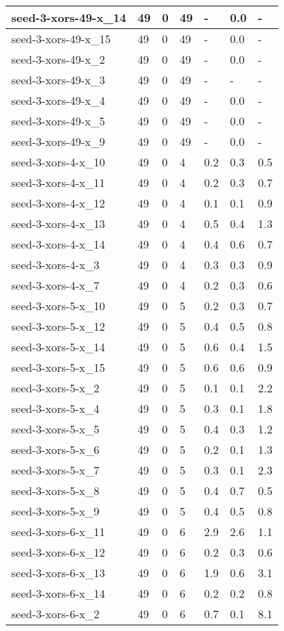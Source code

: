 \begin{scriptsize}
\begin{longtable}{|p{5cm}|l|l|l|l|l|l|}
seed-3-xors-49-x\_14&49&0&49&-&0.0&- \\ \hline 
seed-3-xors-49-x\_15&49&0&49&-&0.0&- \\ \hline 
seed-3-xors-49-x\_2&49&0&49&-&0.0&- \\ \hline 
seed-3-xors-49-x\_3&49&0&49&-&-&- \\ \hline 
seed-3-xors-49-x\_4&49&0&49&-&0.0&- \\ \hline 
seed-3-xors-49-x\_5&49&0&49&-&0.0&- \\ \hline 
seed-3-xors-49-x\_9&49&0&49&-&0.0&- \\ \hline 
seed-3-xors-4-x\_10&49&0&4&0.2&0.3&0.5 \\ \hline 
seed-3-xors-4-x\_11&49&0&4&0.2&0.3&0.7 \\ \hline 
seed-3-xors-4-x\_12&49&0&4&0.1&0.1&0.9 \\ \hline 
seed-3-xors-4-x\_13&49&0&4&0.5&0.4&1.3 \\ \hline 
seed-3-xors-4-x\_14&49&0&4&0.4&0.6&0.7 \\ \hline 
seed-3-xors-4-x\_3&49&0&4&0.3&0.3&0.9 \\ \hline 
seed-3-xors-4-x\_7&49&0&4&0.2&0.3&0.6 \\ \hline 
seed-3-xors-5-x\_10&49&0&5&0.2&0.3&0.7 \\ \hline 
seed-3-xors-5-x\_12&49&0&5&0.4&0.5&0.8 \\ \hline 
seed-3-xors-5-x\_14&49&0&5&0.6&0.4&1.5 \\ \hline 
seed-3-xors-5-x\_15&49&0&5&0.6&0.6&0.9 \\ \hline 
seed-3-xors-5-x\_2&49&0&5&0.1&0.1&2.2 \\ \hline 
seed-3-xors-5-x\_4&49&0&5&0.3&0.1&1.8 \\ \hline 
seed-3-xors-5-x\_5&49&0&5&0.4&0.3&1.2 \\ \hline 
seed-3-xors-5-x\_6&49&0&5&0.2&0.1&1.3 \\ \hline 
seed-3-xors-5-x\_7&49&0&5&0.3&0.1&2.3 \\ \hline 
seed-3-xors-5-x\_8&49&0&5&0.4&0.7&0.5 \\ \hline 
seed-3-xors-5-x\_9&49&0&5&0.4&0.5&0.8 \\ \hline 
seed-3-xors-6-x\_11&49&0&6&2.9&2.6&1.1 \\ \hline 
seed-3-xors-6-x\_12&49&0&6&0.2&0.3&0.6 \\ \hline 
seed-3-xors-6-x\_13&49&0&6&1.9&0.6&3.1 \\ \hline 
seed-3-xors-6-x\_14&49&0&6&0.2&0.2&0.8 \\ \hline 
seed-3-xors-6-x\_2&49&0&6&0.7&0.1&8.1 \\ \hline 

\end{longtable}
\end{scriptsize}
